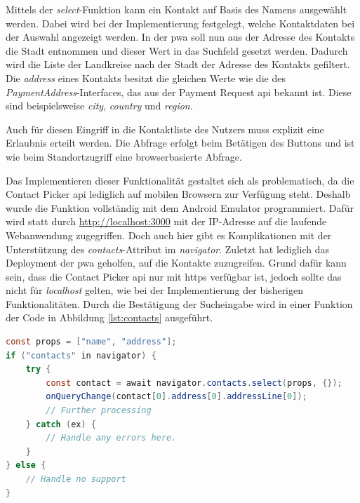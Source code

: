 Mittels der \textit{select}-Funktion kann ein Kontakt auf Basis des Namens ausgewählt werden.
Dabei wird bei der Implementierung festgelegt, welche Kontaktdaten bei der Auswahl angezeigt werden.
In der \ac{pwa} soll nun aus der Adresse des Kontakts die Stadt entnommen und dieser Wert in das Suchfeld gesetzt werden.
Dadurch wird die Liste der Landkreise nach der Stadt der Adresse des Kontakts gefiltert.
Die \textit{address} eines Kontakts besitzt die gleichen Werte wie die des \textit{PaymentAddress}-Interfaces, das aus der Payment Request \ac{api} bekannt ist.
Diese sind beispielsweise \textit{city}, \textit{country} und \textit{region}.

Auch für diesen Eingriff in die Kontaktliste des Nutzers muss explizit eine Erlaubnis erteilt werden.
Die Abfrage erfolgt beim Betätigen des Buttons und ist wie beim Standortzugriff eine browserbasierte Abfrage.

Das Implementieren dieser Funktionalität gestaltet sich als problematisch, da die Contact Picker \ac{api} lediglich auf mobilen Browsern zur Verfügung steht.
Deshalb wurde die Funktion vollständig mit dem Android Emulator programmiert.
Dafür wird statt durch \url{http://localhost:3000} mit der IP-Adresse auf die laufende Webanwendung zugegriffen.
Doch auch hier gibt es Komplikationen mit der Unterstützung des \textit{contacts}-Attribut im \textit{navigator}.
Zuletzt hat lediglich das Deployment der \ac{pwa} geholfen, auf die Kontakte zuzugreifen.
Grund dafür kann sein, dass die Contact Picker \ac{api} nur mit \ac{https} verfügbar ist, jedoch sollte das nicht für \textit{localhost} gelten, wie bei der Implementierung der bisherigen Funktionalitäten.
Durch die Bestätigung der Sucheingabe wird in einer Funktion der Code in Abbildung \ref{lst:contacts} ausgeführt.

\begin{lstlisting}[language=Java,caption={Zugriff auf Kontakte},captionpos=b,label={lst:contacts}]
const props = ["name", "address"];
if ("contacts" in navigator) {
	try {
		const contact = await navigator.contacts.select(props, {});
        onQueryChange(contact[0].address[0].addressLine[0]);
		// Further processing
	} catch (ex) {
		// Handle any errors here.
	}
} else {
	// Handle no support
}
\end{lstlisting}

